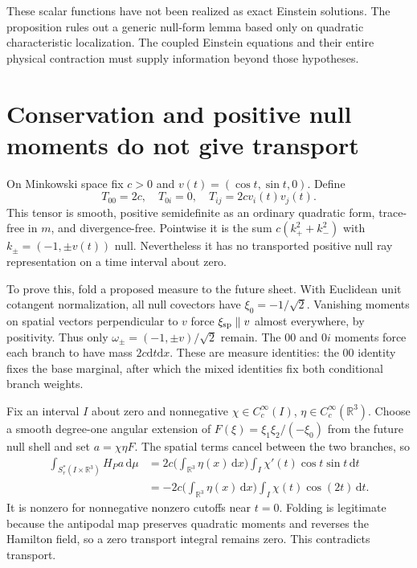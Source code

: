 \documentclass[11pt,a4paper]{article}
\numberwithin{equation}{section}
\newcommand{\dd}{\mathrm d}
\newcommand{\R}{\mathbb R}
\theoremstyle{definition}
\begin{document}
These scalar functions have not been realized as exact Einstein solutions. The proposition rules out a generic null-form lemma based only on quadratic characteristic localization. The coupled Einstein equations and their entire physical contraction must supply information beyond those hypotheses.

\section{Conservation and positive null moments do not give transport}\label{sec:rotating}

On Minkowski space fix $c>0$ and $v(t)=(\cos t,\sin t,0)$. Define
\begin{equation*}
T_{00}=2c,\quad T_{0i}=0,\quad T_{ij}=2c v_i(t)v_j(t).
\end{equation*}
This tensor is smooth, positive semidefinite as an ordinary quadratic form, trace-free in $m$, and divergence-free. Pointwise it is the sum $c(k_+^2+k_-^2)$ with $k_\pm=(-1,\pm v(t))$ null. Nevertheless it has no transported positive null ray representation on a time interval about zero.

To prove this, fold a proposed measure to the future sheet. With Euclidean unit cotangent normalization, all null covectors have $\xi_0=-1/\sqrt2$. Vanishing moments on spatial vectors perpendicular to $v$ force $\xi_{\rm sp}\parallel v$ almost everywhere, by positivity. Thus only $\omega_\pm=(-1,\pm v)/\sqrt2$ remain. The $00$ and $0i$ moments force each branch to have mass $2c\dd t\dd x$. These are measure identities: the $00$ identity fixes the base marginal, after which the mixed identities fix both conditional branch weights.

Fix an interval $I$ about zero and nonnegative
$\chi\in C_c^\infty(I)$, $\eta\in C_c^\infty(\R^3)$.
Choose a smooth degree-one angular extension of
$F(\xi)=\xi_1\xi_2/(-\xi_0)$ from the future null shell and set
$a=\chi\eta F$. The spatial terms cancel between the two branches, so
\begin{equation*}
\begin{aligned}
\int_{S_r^*(I\times\R^3)}H_Pa\,\dd\mu
&=2c\bigg(\int_{\R^3}\eta(x)\,\dd x\bigg)
 \int_I\chi'(t)\cos t\sin t\,\dd t\\
&=-2c\bigg(\int_{\R^3}\eta(x)\,\dd x\bigg)
 \int_I\chi(t)\cos(2t)\,\dd t.
\end{aligned}
\end{equation*}
It is nonzero for nonnegative nonzero cutoffs near $t=0$. Folding is legitimate because the antipodal map preserves quadratic moments and reverses the Hamilton field, so a zero transport integral remains zero. This contradicts transport.
\end{document}
